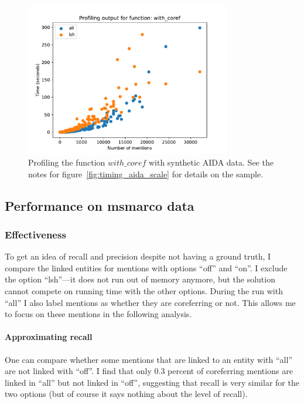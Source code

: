 \documentclass[a4paper,11pt]{article}
\numberwithin{equation}{section} %
\begin{document}
\begin{figure}[H]
  \centering
  \includegraphics[width = 0.8\textwidth]{../figs/profile_aida_scale.pdf}
  \caption{Profiling the function $with\_coref$ with synthetic AIDA data. See the notes for figure~\ref{fig:timing_aida_scale} for details on the sample.}
  \label{fig:profile_aida_scale}
\end{figure}



\subsection{Performance on msmarco data}

\subsubsection{Effectiveness}

To get an idea of recall and precision despite not having a ground truth, I compare the linked entities for mentions with options ``off'' and ``on''.  I exclude the option ``lsh''---it does not run out of memory anymore, but the solution cannot compete on running time with the other options. 
During the run with ``all'' I also label mentions as whether they are coreferring or not. This allows me to focus on these mentions in the following analysis.


\paragraph{Approximating recall}
One can compare whether some mentions that are linked to an entity with ``all'' are not linked with ``off''. I find that only 0.3 percent of coreferring mentions are linked in ``all'' but not linked in ``off'', suggesting that recall is very similar for the two options (but of course it says nothing about the level of recall).
\end{document}
